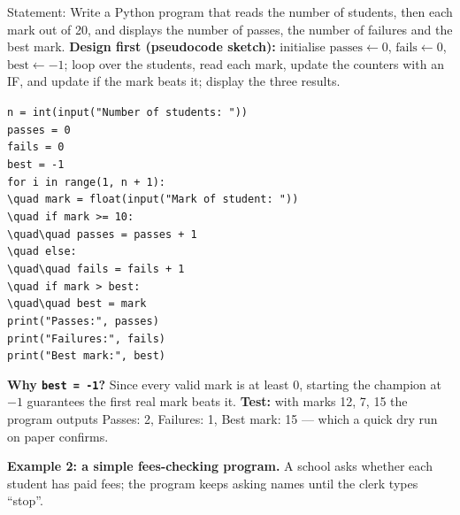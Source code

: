 \documentclass[11pt]{article}
\begin{document}
\begin{exoresolu}
Statement: Write a Python program that reads the number of students, then each mark out of 20, and displays the number of passes, the number of failures and the best mark.
\tcblower
\textbf{Design first (pseudocode sketch):} initialise $\text{passes} \leftarrow 0$, $\text{fails} \leftarrow 0$, $\text{best} \leftarrow -1$; loop over the students, read each mark, update the counters with an IF, and update  if the mark beats it; display the three results.
\begin{flushleft}
\texttt{n = int(input("Number of students: "))}\\
\texttt{passes = 0}\\
\texttt{fails = 0}\\
\texttt{best = -1}\\
\texttt{for i in range(1, n + 1):}\\
\texttt{\textbackslash{}quad mark = float(input("Mark of student: "))}\\
\texttt{\textbackslash{}quad if mark >= 10:}\\
\texttt{\textbackslash{}quad\textbackslash{}quad passes = passes + 1}\\
\texttt{\textbackslash{}quad else:}\\
\texttt{\textbackslash{}quad\textbackslash{}quad fails = fails + 1}\\
\texttt{\textbackslash{}quad if mark > best:}\\
\texttt{\textbackslash{}quad\textbackslash{}quad best = mark}\\
\texttt{print("Passes:", passes)}\\
\texttt{print("Failures:", fails)}\\
\texttt{print("Best mark:", best)}
\end{flushleft}
\textbf{Why \texttt{best = -1}?} Since every valid mark is at least 0, starting the champion at $-1$ guarantees the first real mark beats it. \textbf{Test:} with marks 12, 7, 15 the program outputs Passes: 2, Failures: 1, Best mark: 15 --- which a quick dry run on paper confirms.
\end{exoresolu}

\textbf{Example 2: a simple fees-checking program.} A school asks whether each student has paid fees; the program keeps asking names until the clerk types ``stop''.
\end{document}
